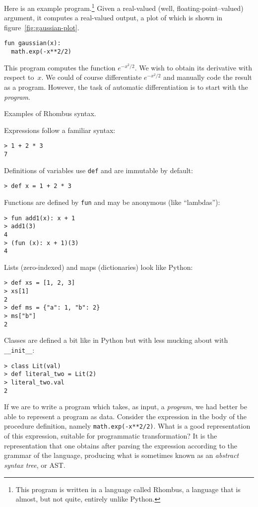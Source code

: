\documentclass[11pt, a4paper]{article}
\newcommand{\cd}[1]{\texttt{#1}}
\begin{document}
Here is an example program.\footnote{This program is written in a
  language called Rhombus, a language that is almost, but not quite,
  entirely unlike Python.} Given a real-valued (well, floating-point--valued)
argument, it computes a real-valued output, a plot of which is shown
in figure~\ref{fig:gaussian-plot}.
\begin{verbatim}
fun gaussian(x):
  math.exp(-x**2/2)
\end{verbatim}
This program computes the function $e^{-x^2/2}$. We wish to obtain its
derivative with respect to~$x$. We could of course
differentiate $e^{-x^2/2}$ and manually code the result as a
program. However, the task of automatic differentiation is to start
with the \emph{program}.
\begin{marginfigure}
  \caption{Examples of Rhombus syntax.}
  \footnotesize
  Expressions follow a familiar syntax:
\begin{verbatim}
> 1 + 2 * 3
7
\end{verbatim}
  Definitions of variables use \cd{def} and are immutable by default:
\begin{verbatim}
> def x = 1 + 2 * 3
\end{verbatim}
  Functions are defined by \cd{fun} and may be anonymous (like
  ``lambdas''):
\begin{verbatim}
> fun add1(x): x + 1
> add1(3)
4
> (fun (x): x + 1)(3)
4
\end{verbatim}
  Lists (zero-indexed) and maps (dictionaries) look like Python:
\begin{verbatim}
> def xs = [1, 2, 3]
> xs[1]
2
> def ms = {"a": 1, "b": 2}
> ms["b"]
2
\end{verbatim}
  Classes are defined a bit like in Python but with less mucking about
  with \cd{__init__}:
\begin{verbatim}
> class Lit(val)
> def literal_two = Lit(2)
> literal_two.val
2
\end{verbatim}
\end{marginfigure}

If we are to write a program which takes, as input, a \emph{program},
we had better be able to represent a program as data. Consider the
expression in the body of the procedure definition, namely
\cd{math.exp(-x**2/2)}. What is a good representation of this
expression, suitable for programmatic transformation? It is the
representation that one obtains after parsing the expression according
to the grammar of the language, producing what is sometimes known as
an \emph{abstract syntax tree}, or AST.
\end{document}
